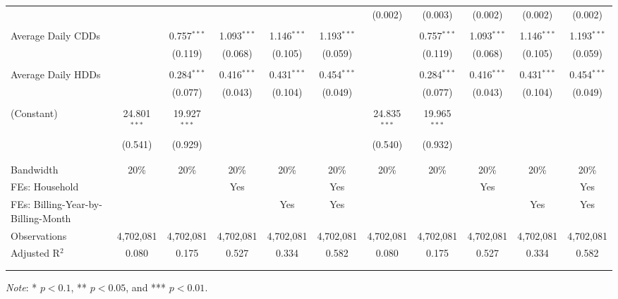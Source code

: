 {\begin{table}[t!]
\begin{adjustbox}{scale = 0.75}
\begin{threeparttable}
\begin{tabular}{@{\extracolsep{-1.5pt}}lcccccccccc}
                    &  &  &  &  &  & (0.002) & (0.003) & (0.002) & (0.002) & (0.002) \\ 
                    & & & & & & & & & & \\ 
                    Average Daily CDDs &  & 0.757$^{***}$ & 1.093$^{***}$ & 1.146$^{***}$ & 1.193$^{***}$ &  & 0.757$^{***}$ & 1.093$^{***}$ & 1.146$^{***}$ & 1.193$^{***}$ \\ 
                    &  & (0.119) & (0.068) & (0.105) & (0.059) &  & (0.119) & (0.068) & (0.105) & (0.059) \\ 
                    & & & & & & & & & & \\ 
                    Average Daily HDDs &  & 0.284$^{***}$ & 0.416$^{***}$ & 0.431$^{***}$ & 0.454$^{***}$ &  & 0.284$^{***}$ & 0.416$^{***}$ & 0.431$^{***}$ & 0.454$^{***}$ \\ 
                    &  & (0.077) & (0.043) & (0.104) & (0.049) &  & (0.077) & (0.043) & (0.104) & (0.049) \\ 
                    & & & & & & & & & & \\ 
                    (Constant) & 24.801$^{***}$ & 19.927$^{***}$ &  &  &  & 24.835$^{***}$ & 19.965$^{***}$ &  &  &  \\ 
                    & (0.541) & (0.929) &  &  &  & (0.540) & (0.932) &  &  &  \\ 
                    & & & & & & & & & & \\
                    \hline
                    \\[-2.0ex]
                    Bandwidth & 20\% & 20\% & 20\% & 20\% & 20\% & 20\% & 20\% & 20\% & 20\% & 20\% \\
                    FEs: Household &  &  & Yes &  & Yes &  &  & Yes &  & Yes \\
                    FEs: Billing-Year-by-Billing-Month &  &  &  & Yes & Yes &  &  &  & Yes & Yes \\
                    Observations & 4,702,081 & 4,702,081 & 4,702,081 & 4,702,081 & 4,702,081 & 4,702,081 & 4,702,081 & 4,702,081 & 4,702,081 & 4,702,081 \\ 
                    Adjusted R$^{2}$ & 0.080 & 0.175 & 0.527 & 0.334 & 0.582 & 0.080 & 0.175 & 0.527 & 0.334 & 0.582 \\
                    \\[-2.0ex]
                    \hline \hline
                    \\[-4.5ex]
                \end{tabular}
                \begin{tablenotes}[flushleft]
                    \footnotesize
                    \item \textit{Note}: * $p < 0.1$, ** $p < 0.05$, and *** $p < 0.01$.
                \end{tablenotes}
            \end{threeparttable}
        \end{adjustbox}
    \end{table}
}
